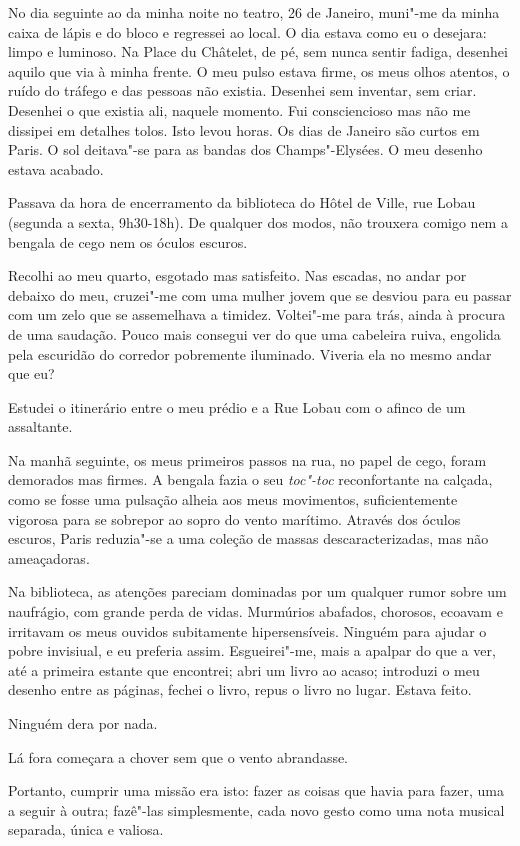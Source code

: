No dia seguinte ao da minha noite no teatro, 26 de Janeiro, muni"-me da
minha caixa de lápis e do bloco e regressei ao local. O dia estava como
eu o desejara: limpo e luminoso. Na Place du Châtelet, de pé, sem nunca
sentir fadiga, desenhei aquilo que via à minha frente. O meu pulso
estava firme, os meus olhos atentos, o ruído do tráfego e das pessoas
não existia. Desenhei sem inventar, sem criar. Desenhei o que existia
ali, naquele momento. Fui consciencioso mas não me dissipei em detalhes
tolos. Isto levou horas. Os dias de Janeiro são curtos em Paris. O sol
deitava"-se para as bandas dos Champs"-Elysées. O meu desenho estava acabado.

Passava da hora de encerramento da biblioteca do Hôtel de Ville, rue
Lobau (segunda a sexta, 9h30-18h). De qualquer dos modos, não trouxera
comigo nem a bengala de cego nem os óculos escuros.

Recolhi ao meu quarto, esgotado mas satisfeito. Nas escadas, no andar
por debaixo do meu, cruzei"-me com uma mulher jovem que se desviou para
eu passar com um zelo que se assemelhava a timidez. Voltei"-me para trás,
ainda à procura de uma saudação. Pouco mais consegui ver do que uma
cabeleira ruiva, engolida pela escuridão do corredor pobremente iluminado. Viveria ela no mesmo andar que eu?

Estudei o itinerário entre o meu prédio e a Rue Lobau com o afinco de um
assaltante.

Na manhã seguinte, os meus primeiros passos na rua, no papel de cego,
foram demorados mas firmes. A bengala fazia
o seu \emph{toc"-toc }reconfortante na calçada, como se fosse uma pulsação alheia aos meus movimentos, suficientemente vigorosa para se
sobrepor ao sopro do vento marítimo. Através dos óculos escuros, Paris
reduzia"-se a uma coleção de massas descaracterizadas, mas não
ameaçadoras.

Na biblioteca, as atenções pareciam dominadas por um qualquer rumor
sobre um naufrágio, com grande perda de vidas. Murmúrios abafados,
chorosos, ecoavam e irritavam os meus ouvidos subitamente
hipersensíveis. Ninguém para ajudar o pobre invisiual, e eu preferia
assim. Esgueirei"-me, mais a apalpar do que a ver, até a primeira estante
que encontrei; abri um livro ao acaso; introduzi o meu desenho entre
as páginas, fechei o livro, repus o livro no lugar. Estava feito.

Ninguém dera por nada.

Lá fora começara a chover sem que o vento abrandasse.

Portanto, cumprir uma missão era isto: fazer as coisas que havia para
fazer, uma a seguir à outra; fazê"-las simplesmente, cada novo gesto como
uma nota musical separada, única e valiosa.


